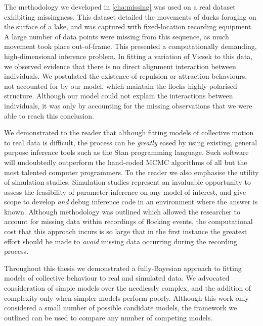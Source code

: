The methodology we developed in \cref{cha:missing} was used on a real dataset
exhibiting missingness. This dataset detailed the movements of ducks
foraging on the surface of a lake, and was captured with fixed-location
recording equipment. A large number of data points were missing from this
sequence, as much movement took place out-of-frame. This presented a
computationally demanding, high-dimensional inference problem. In fitting a
variation of Vicsek to this data, we observed evidence that there is no direct
alignment interaction between individuals. We postulated the existence of
repulsion or attraction behaviours, not accounted for by our model, which
maintain the flocks highly polarised structure. Although our model could not
explain the interactions between individuals, it was only by accounting for the
missing observations that we were able to reach this conclusion.

We demonstrated to the reader that although fitting models of collective motion
to real data is difficult, the process can be \emph{greatly} eased by using
existing, general purpose inference tools such as the Stan programming
language. Such software will undoubtedly outperform the hand-coded MCMC
algorithms of all but the most talented computer programmers. To the reader we
also emphasise the utility of simulation studies. Simulation studies represent
an invaluable opportunity to assess the feasibility of parameter inference on
any model of interest, and give scope to develop \emph{and} debug inference
code in an environment where the answer is known. Although methodology was
outlined which allowed the researcher to account for missing data within
recordings of flocking events, the computational cost that this approach incurs
is so large that in the first instance the greatest effort should be made to
\emph{avoid} missing data occurring during the recording process.

Throughout this thesis we demonstrated a fully-Bayesian approach to fitting
models of collective behaviour to real and simulated data. We advocated
consideration of simple models over the needlessly complex, and the addition of
complexity only when simpler models perform poorly. Although this work only
considered a small number of possible candidate models, the framework we
outlined can be used to compare any number of competing models.
